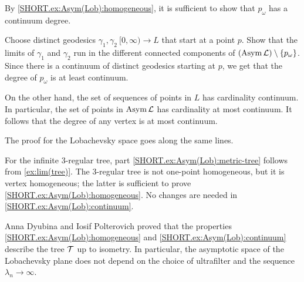 By \ref{SHORT.ex:Asym(Lob):homogeneous}, it is sufficient to show that $p_\omega$ has a continuum degree.

Choose distinct geodesics $\gamma_1,\gamma_2\:[0,\infty)\to L$ that start at a point $p$.
Show that the limits of $\gamma_1$ and $\gamma_2$ run in the different connected components of $(\mathop{\rm Asym}\nolimits\mathcal{L})\setminus \{p_\omega\}$.
Since there is a continuum of distinct geodesics starting at $p$,
we get that the degree of $p_\omega$ is at least continuum.

On the other hand, the set of sequences of points in $L$  has cardinality continuum.
In particular, the set of points in $\mathop{\rm Asym}\nolimits\mathcal{L}$ has cardinality at most continuum.
It follows that the degree of any vertex is at most continuum.

The proof for the Lobachevsky space goes along the same lines.

For the infinite 3-regular tree, part \ref{SHORT.ex:Asym(Lob):metric-tree} follows from \ref{ex:lim(tree)}.
The 3-regular tree is not one-point homogeneous, but it is vertex homogeneous; the latter is sufficient to prove \ref{SHORT.ex:Asym(Lob):homogeneous}.
No changes are needed in \ref{SHORT.ex:Asym(Lob):continuum}.

Anna Dyubina and Iosif Polterovich \cite{dyubina-polterovich} proved that the properties \ref{SHORT.ex:Asym(Lob):homogeneous} and \ref{SHORT.ex:Asym(Lob):continuum} describe the tree $\mathcal{T}$ up to isometry.
In particular, the asymptotic space of the Lobachevsky plane does not depend on the choice of ultrafilter and the sequence $\lambda_n\to \infty$.
